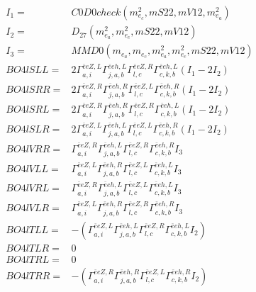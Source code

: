 \documentclass[A4,landscape]{article}
\begin{document}
\begin{align} 
I_1 = & C0D0check(m^2_{e_{{c}}}, mS22, mV12, m^2_{e_{{a}}}) \\ 
I_2 = & D_{27}(m^2_{e_{{a}}}, m^2_{e_{{c}}}, mS22, mV12) \\ 
I_3 = & MMD0(m_{e_{{a}}}, m_{e_{{c}}}, m^2_{e_{{a}}}, m^2_{e_{{c}}}, mS22, mV12) \\ 
  BO4lSLL= & 2  \Gamma^{\bar{e}e Z ,L}_{a, i} \Gamma^{\bar{e}e h ,L}_{j, a, b} \Gamma^{\bar{e}e Z ,R}_{l, c} \Gamma^{\bar{e}e h ,L}_{c, k, b} (I_1 - 2 I_2) \\ 
  BO4lSRR= & 2  \Gamma^{\bar{e}e Z ,R}_{a, i} \Gamma^{\bar{e}e h ,R}_{j, a, b} \Gamma^{\bar{e}e Z ,L}_{l, c} \Gamma^{\bar{e}e h ,R}_{c, k, b} (I_1 - 2 I_2) \\ 
  BO4lSRL= & 2  \Gamma^{\bar{e}e Z ,R}_{a, i} \Gamma^{\bar{e}e h ,R}_{j, a, b} \Gamma^{\bar{e}e Z ,R}_{l, c} \Gamma^{\bar{e}e h ,L}_{c, k, b} (I_1 - 2 I_2) \\ 
  BO4lSLR= & 2  \Gamma^{\bar{e}e Z ,L}_{a, i} \Gamma^{\bar{e}e h ,L}_{j, a, b} \Gamma^{\bar{e}e Z ,L}_{l, c} \Gamma^{\bar{e}e h ,R}_{c, k, b} (I_1 - 2 I_2) \\ 
  BO4lVRR= &  \Gamma^{\bar{e}e Z ,R}_{a, i} \Gamma^{\bar{e}e h ,L}_{j, a, b} \Gamma^{\bar{e}e Z ,R}_{l, c} \Gamma^{\bar{e}e h ,R}_{c, k, b} I_3 \\ 
  BO4lVLL= &  \Gamma^{\bar{e}e Z ,L}_{a, i} \Gamma^{\bar{e}e h ,R}_{j, a, b} \Gamma^{\bar{e}e Z ,L}_{l, c} \Gamma^{\bar{e}e h ,L}_{c, k, b} I_3 \\ 
  BO4lVRL= &  \Gamma^{\bar{e}e Z ,R}_{a, i} \Gamma^{\bar{e}e h ,L}_{j, a, b} \Gamma^{\bar{e}e Z ,L}_{l, c} \Gamma^{\bar{e}e h ,L}_{c, k, b} I_3 \\ 
  BO4lVLR= &  \Gamma^{\bar{e}e Z ,L}_{a, i} \Gamma^{\bar{e}e h ,R}_{j, a, b} \Gamma^{\bar{e}e Z ,R}_{l, c} \Gamma^{\bar{e}e h ,R}_{c, k, b} I_3 \\ 
  BO4lTLL= & -( \Gamma^{\bar{e}e Z ,L}_{a, i} \Gamma^{\bar{e}e h ,L}_{j, a, b} \Gamma^{\bar{e}e Z ,R}_{l, c} \Gamma^{\bar{e}e h ,L}_{c, k, b} I_2) \\ 
  BO4lTLR= & 0 \\ 
  BO4lTRL= & 0 \\ 
  BO4lTRR= & -( \Gamma^{\bar{e}e Z ,R}_{a, i} \Gamma^{\bar{e}e h ,R}_{j, a, b} \Gamma^{\bar{e}e Z ,L}_{l, c} \Gamma^{\bar{e}e h ,R}_{c, k, b} I_2) \\ 
\end{align} 
\end{document}
